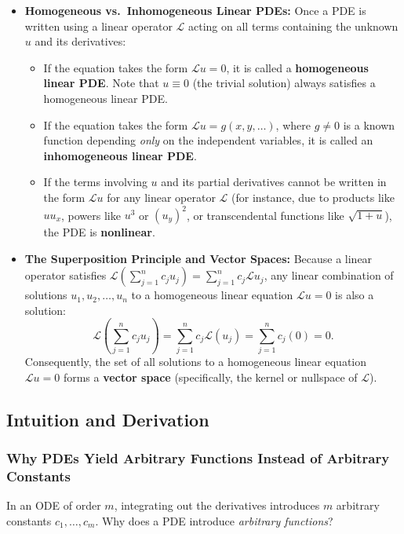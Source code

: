 \documentclass[11pt,a4paper]{article}
\begin{document}
\begin{itemize}
\begin{enumerate}
    \end{enumerate}
    Equivalently, $\mathcal{L}(c_1 u + c_2 v) = c_1 \mathcal{L}u + c_2 \mathcal{L}v$ for all functions $u, v$ and constants $c_1, c_2$.
    \item \textbf{Homogeneous vs.\ Inhomogeneous Linear PDEs:} Once a PDE is written using a linear operator $\mathcal{L}$ acting on all terms containing the unknown $u$ and its derivatives:
    \begin{itemize}
        \item If the equation takes the form $\mathcal{L}u = 0$, it is called a \textbf{homogeneous linear PDE}. Note that $u \equiv 0$ (the trivial solution) always satisfies a homogeneous linear PDE.
        \item If the equation takes the form $\mathcal{L}u = g(x, y, \dots)$, where $g \neq 0$ is a known function depending \emph{only} on the independent variables, it is called an \textbf{inhomogeneous linear PDE}.
        \item If the terms involving $u$ and its partial derivatives cannot be written in the form $\mathcal{L}u$ for any linear operator $\mathcal{L}$ (for instance, due to products like $u u_x$, powers like $u^3$ or $(u_y)^2$, or transcendental functions like $\sqrt{1+u}$), the PDE is \textbf{nonlinear}.
    \end{itemize}
    \item \textbf{The Superposition Principle and Vector Spaces:} Because a linear operator satisfies $\mathcal{L}\left(\sum_{j=1}^n c_j u_j\right) = \sum_{j=1}^n c_j \mathcal{L}u_j$, any linear combination of solutions $u_1, u_2, \dots, u_n$ to a homogeneous linear equation $\mathcal{L}u = 0$ is also a solution:
    \[
        \mathcal{L}\left(\sum_{j=1}^n c_j u_j\right) = \sum_{j=1}^n c_j \mathcal{L}(u_j) = \sum_{j=1}^n c_j (0) = 0.
    \]
    Consequently, the set of all solutions to a homogeneous linear equation $\mathcal{L}u = 0$ forms a \textbf{vector space} (specifically, the kernel or nullspace of $\mathcal{L}$).
\end{itemize}

\subsection{Intuition and Derivation}
\subsubsection{Why PDEs Yield Arbitrary Functions Instead of Arbitrary Constants}
In an ODE of order $m$, integrating out the derivatives introduces $m$ arbitrary constants $c_1, \dots, c_m$. Why does a PDE introduce \emph{arbitrary functions}?
\end{document}
